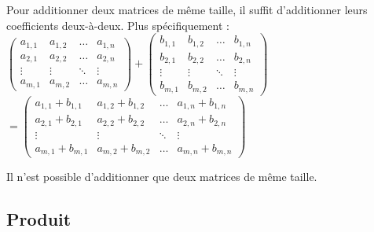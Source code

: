 	\begin{formula}
		\contentwidth[big]
		Pour additionner deux matrices de même taille, il suffit d'additionner leurs coefficients deux-à-deux. Plus spécifiquement :
		\newpar
		$\displaystyle{\begin{pmatrix}a_{1,1} & a_{1,2} & \dots & a_{1,n} \\ a_{2,1} & a_{2,2} & \dots & a_{2,n} \\ \vdots & \vdots & \ddots & \vdots \\ a_{m,1} & a_{m,2} & \dots & a_{m,n}\end{pmatrix} + \begin{pmatrix}b_{1,1} & b_{1,2} & \dots & b_{1,n} \\ b_{2,1} & b_{2,2} & \dots & b_{2,n} \\ \vdots & \vdots & \ddots & \vdots \\ b_{m,1} & b_{m,2} & \dots & b_{m,n}\end{pmatrix}}$
		\newpar
		$\displaystyle{= \begin{pmatrix}a_{1,1} + b_{1,1} & a_{1,2} + b_{1,2} & \dots & a_{1,n} + b_{1,n} \\ a_{2,1} + b_{2,1} & a_{2,2} + b_{2,2} & \dots & a_{2,n} + b_{2,n} \\ \vdots & \vdots & \ddots & \vdots \\ a_{m,1} + b_{m,1} & a_{m,2} + b_{m,2} & \dots & a_{m,n} + b_{m,n}\end{pmatrix}}$
	\end{formula}
	
	\begin{tip}[Attention !]
		Il n'est possible d'additionner que deux matrices de même taille.
	\end{tip}
	
	\subsection{Produit}
	
